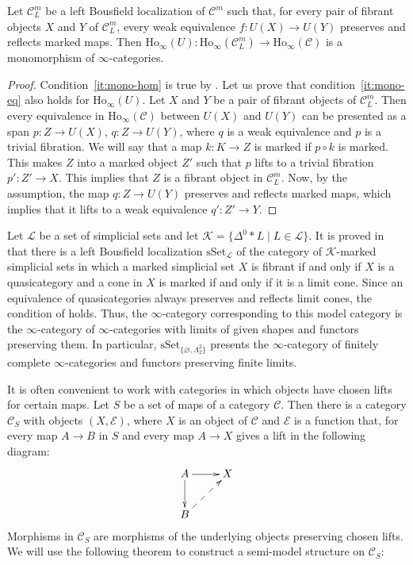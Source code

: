 \documentclass[reqno]{amsart}
\theoremstyle{definition}
\theoremstyle{remark}
\newcommand{\fs}[1]{\mathrm{#1}}
\newcommand{\Ho}{\fs{Ho}}
\newcommand{\cat}[1]{\mathcal{#1}}
\newcommand{\C}{\cat{C}}
\newcommand{\sSet}{\fs{sSet}}
\numberwithin{figure}{section}
\begin{document}
\begin{prop}
Let $\C^m_L$ be a left Bousfield localization of $\C^m$ such that, for every pair of fibrant objects $X$ and $Y$ of $\C^m_L$, every weak equivalence $f : U(X) \to U(Y)$ preserves and reflects marked maps.
Then $\Ho_\infty(U) : \Ho_\infty(\C^m_L) \to \Ho_\infty(\C)$ is a monomorphism of $\infty$-categories.
\end{prop}
\begin{proof}
Condition~\eqref{it:mono-hom} is true by .
Let us prove that condition~\eqref{it:mono-eq} also holds for $\Ho_\infty(U)$.
Let $X$ and $Y$ be a pair of fibrant objects of $\C^m_L$.
Then every equivalence in $\Ho_\infty(\C)$ between $U(X)$ and $U(Y)$ can be presented as a span $p : Z \to U(X)$, $q : Z \to U(Y)$, where $q$ is a weak equivalence and $p$ is a trivial fibration.
We will say that a map $k : K \to Z$ is marked if $p \circ k$ is marked.
This makes $Z$ into a marked object $Z'$ such that $p$ lifts to a trivial fibration $p' : Z' \to X$.
This implies that $Z$ is a fibrant object in $\C^m_L$.
Now, by the assumption, the map $q : Z \to U(Y)$ preserves and reflects marked maps,
which implies that it lifts to a weak equivalence $q' : Z' \to Y$.
\end{proof}

\begin{example}
Let $\mathcal{L}$ be a set of simplicial sets and let $\mathcal{K} = \{ \Delta^0 * L \mid L \in \mathcal{L} \}$.
It is proved in \cite[Proposition~4.1]{marked-obj} that there is a left Bousfield localization $\sSet_\mathcal{L}$ of the category of $\mathcal{K}$-marked simplicial sets
in which a marked simplicial set $X$ is fibrant if and only if $X$ is a quasicategory and a cone in $X$ is marked if and only if it is a limit cone.
Since an equivalence of quasicategories always preserves and reflects limit cones, the condition of  holds.
Thus, the $\infty$-category corresponding to this model category is the $\infty$-category of $\infty$-categories with limits of given shapes and functors preserving them.
In particular, $\sSet_{\{ \varnothing, \Lambda^2_2 \}}$ presents the $\infty$-category of finitely complete $\infty$-categories and functors preserving finite limits.
\end{example}


It is often convenient to work with categories in which objects have chosen lifts for certain maps.
Let $S$ be a set of maps of a category $\C$.
Then there is a category $\C_S$ with objects $(X,\mathcal{E})$, where $X$ is an object of $\C$ and $\mathcal{E}$ is a function that, for every map $A \to B$ in $S$ and every map $A \to X$ gives a lift in the following diagram:
\[ \xymatrix{ A \ar[r] \ar[d] & X \\
              B \ar@{-->}[ur]
            } \]
Morphisms in $\C_S$ are morphisms of the underlying objects preserving chosen lifts.
We will use the following theorem to construct a semi-model structure on $\C_S$:
\end{document}
